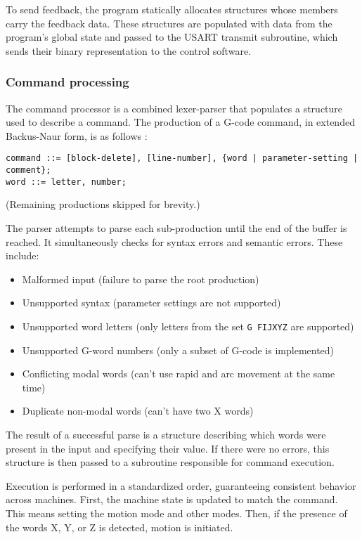 To send feedback, the program statically allocates structures whose members
carry the feedback data. These structures are populated with data from the
program's global state and passed to the USART transmit subroutine, which sends
their binary representation to the control software.

\subsubsection{Command processing}

The command processor is a combined lexer-parser that populates a structure used
to describe a command. The production of a G-code command, in extended
Backus-Naur form, is as follows \cite{gcode}:
\footnotesize
\begin{verbatim}command ::= [block-delete], [line-number], {word | parameter-setting | comment};
word ::= letter, number;\end{verbatim}
\normalsize
(Remaining productions skipped for brevity.)

The parser attempts to parse each sub-production until the end of the buffer is
reached. It simultaneously checks for syntax errors and semantic errors. These
include:
\begin{itemize}
    \item Malformed input (failure to parse the root production)
    \item Unsupported syntax (parameter settings are not supported)
    \item Unsupported word letters (only letters from the set \texttt{G FIJXYZ}
    are supported)
    \item Unsupported G-word numbers (only a subset of G-code is implemented)
    \item Conflicting modal words (can't use rapid and arc movement at the same
    time)
    \item Duplicate non-modal words (can't have two X words)
\end{itemize}
The result of a successful parse is a structure describing which words were
present in the input and specifying their value. If there were no errors, this
structure is then passed to a subroutine responsible for command execution.

Execution is performed in a standardized order, guaranteeing consistent behavior
across machines. First, the machine state is updated to match the command. This
means setting the motion mode and other modes. Then, if the presence of the
words X, Y, or Z is detected, motion is initiated.

